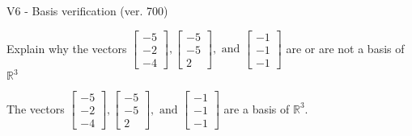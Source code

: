 \begin{exercise}
  \begin{exerciseTitle}V6 - Basis verification (ver. 700)\end{exerciseTitle}
  \begin{exerciseStatement}
    Explain why the vectors \(\left[\begin{array}{r}
-5 \\
-2 \\
-4
\end{array}\right] , \left[\begin{array}{r}
-5 \\
-5 \\
2
\end{array}\right] , \text{ and } \left[\begin{array}{r}
-1 \\
-1 \\
-1
\end{array}\right]\) are or are not a basis of \(\mathbb{R}^3\)	


  \end{exerciseStatement}
  \begin{exerciseAnswer}
   The vectors \(\left[\begin{array}{r}
-5 \\
-2 \\
-4
\end{array}\right] , \left[\begin{array}{r}
-5 \\
-5 \\
2
\end{array}\right] , \text{ and } \left[\begin{array}{r}
-1 \\
-1 \\
-1
\end{array}\right]\) 
  	 are  a basis of \(\mathbb{R}^3\).
  


  \end{exerciseAnswer}
\end{exercise}